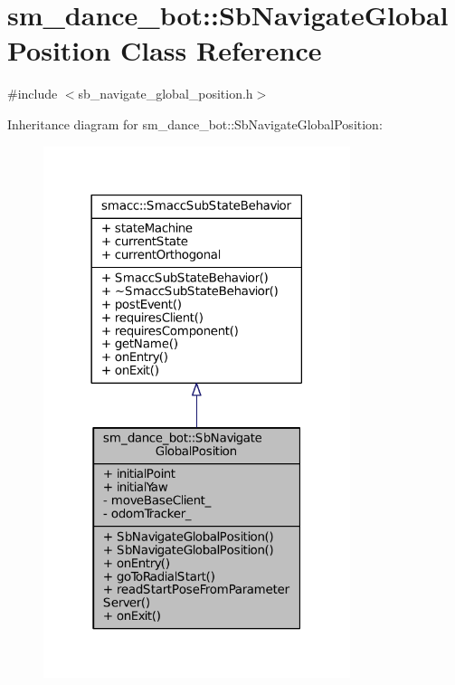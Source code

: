 \hypertarget{classsm__dance__bot_1_1SbNavigateGlobalPosition}{}\section{sm\+\_\+dance\+\_\+bot\+:\+:Sb\+Navigate\+Global\+Position Class Reference}
\label{classsm__dance__bot_1_1SbNavigateGlobalPosition}


{\ttfamily \#include $<$sb\+\_\+navigate\+\_\+global\+\_\+position.\+h$>$}



Inheritance diagram for sm\+\_\+dance\+\_\+bot\+:\+:Sb\+Navigate\+Global\+Position\+:
\nopagebreak
\begin{figure}[H]
\begin{center}
\leavevmode
\includegraphics[width=254pt]{classsm__dance__bot_1_1SbNavigateGlobalPosition__inherit__graph}
\end{center}
\end{figure}


